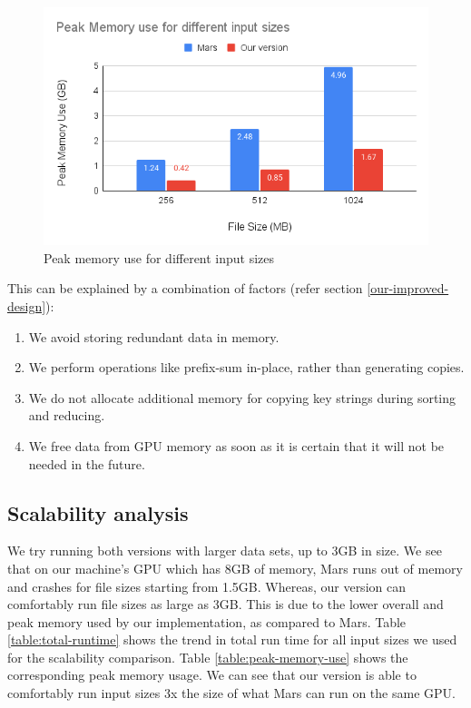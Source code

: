 \documentclass{article}
\begin{document}
\begin{figure}[h]
    \centering
    \includegraphics[width=1\linewidth]{images/mr-peak-memory.png}
    \caption{Peak memory use for different input sizes}
    \label{fig:mr-peak-memory}
\end{figure}

This can be explained by a combination of factors (refer section \ref{our-improved-design}):
\begin{enumerate}
    \item We avoid storing redundant data in memory.
    \item We perform operations like prefix-sum in-place, rather than generating copies.
    \item We do not allocate additional memory for copying key strings during sorting and reducing.
    \item We free data from GPU memory as soon as it is certain that it will not be needed in the future.
\end{enumerate}

\subsection{Scalability analysis}
We try running both versions with larger data sets, up to 3GB in size. We see that on our machine's GPU which has 8GB of memory, Mars runs out of memory and crashes for file sizes starting from 1.5GB. Whereas, our version can comfortably run file sizes as large as 3GB. This is due to the lower overall and peak memory used by our implementation, as compared to Mars. Table \ref{table:total-runtime} shows the trend in total run time for all input sizes we used for the scalability comparison. Table \ref{table:peak-memory-use} shows the corresponding peak memory usage. We can see that our version is able to comfortably run input sizes 3x the size of what Mars can run on the same GPU.   
\end{document}
